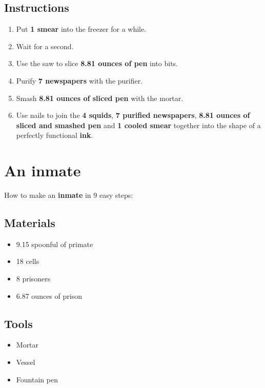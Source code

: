 \documentclass{article}
\begin{document}
\subsection{Instructions}\begin{enumerate}
\item 
Put \textbf{1 smear} into the freezer for a while.
\item 
Wait for a second.
\item 
Use the saw to slice \textbf{8.81 ounces of pen} into bits.
\item 
Purify \textbf{7 newspapers} with the purifier.
\item 
Smash \textbf{8.81 ounces of sliced pen} with the mortar.
\item 
Use nails to join the \textbf{4 squids}, \textbf{7 purified newspapers}, \textbf{8.81 ounces of sliced and smashed pen} and \textbf{1 cooled smear} together into the shape of a perfectly functional \textbf{ink}.
\end{enumerate}
\newpage
\section{An inmate}How to make an \textbf{inmate} in 9 easy steps:

\subsection{Materials}\begin{itemize}
\item 
9.15 spoonful of primate
\item 
18 cells
\item 
8 prisoners
\item 
6.87 ounces of prison
\end{itemize}
\subsection{Tools}\begin{itemize}
\item 
Mortar
\item 
Vessel
\item 
Fountain pen
\end{itemize}
\end{document}
